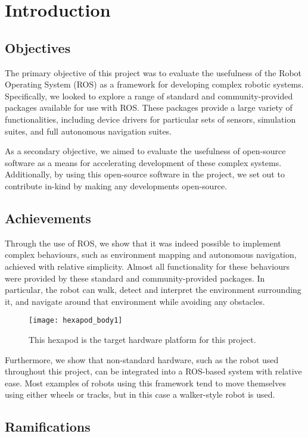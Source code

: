 \chapter{Introduction}


\section{Objectives}

The primary objective of this project was to evaluate the usefulness of the Robot Operating System (ROS) \cite{ros_site} as a framework for developing complex robotic systems. Specifically, we looked to explore a range of standard and community-provided packages available for use with ROS. These packages provide a large variety of functionalities, including device drivers for particular sets of sensors, simulation suites, and full autonomous navigation suites.

As a secondary objective, we aimed to evaluate the usefulness of open-source software as a means for accelerating development of these complex systems. Additionally, by using this open-source software in the project, we set out to contribute in-kind by making any developments open-source.


\section{Achievements}
Through the use of ROS, we show that it was indeed possible to implement complex behaviours, such as environment mapping and autonomous navigation, achieved with relative simplicity. Almost all functionality for these behaviours were provided by these standard and community-provided packages. In particular, the robot can walk, detect and interpret the environment surrounding it, and navigate around that environment while avoiding any obstacles.

\begin{figure}[!h]
    \centering
    \texttt{[image: hexapod\_body1]}
    \caption{This hexapod is the target hardware platform for this project.}
\end{figure}

Furthermore, we show that non-standard hardware, such as the robot used throughout this project, can be integrated into a ROS-based system with relative ease. Most examples of robots using this framework tend to move themselves using either wheels or tracks, but in this case a walker-style robot is used.


\section{Ramifications}